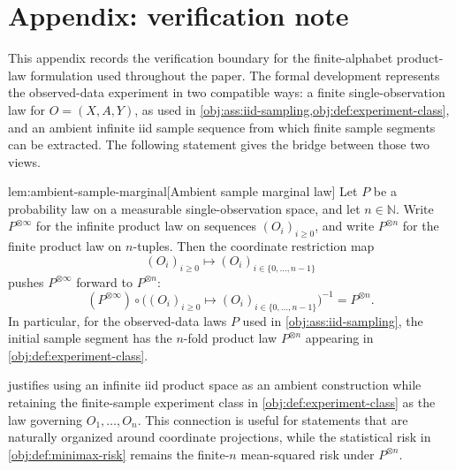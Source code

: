 \section{Appendix: verification note}

This appendix records the verification boundary for the finite-alphabet product-law formulation used throughout the paper. The formal development represents the observed-data experiment in two compatible ways: a finite single-observation law for \(O=(X,A,Y)\), as used in \cref{obj:ass:iid-sampling,obj:def:experiment-class}, and an ambient infinite iid sample sequence from which finite sample segments can be extracted. The following statement gives the bridge between those two views.

\begin{lemmav}{lem:ambient-sample-marginal}[Ambient sample marginal law]
Let \(P\) be a probability law on a measurable single-observation space, and let \(n\in\mathbb N\). Write \(P^{\otimes\infty}\) for the infinite product law on sequences \((O_i)_{i\ge 0}\), and write \(P^{\otimes n}\) for the finite product law on \(n\)-tuples. Then the coordinate restriction map
\[
(O_i)_{i\ge 0}\longmapsto (O_i)_{i\in\{0,\ldots,n-1\}}
\]
pushes \(P^{\otimes\infty}\) forward to \(P^{\otimes n}\):
\[
(P^{\otimes\infty})\circ\bigl((O_i)_{i\ge 0}\mapsto (O_i)_{i\in\{0,\ldots,n-1\}}\bigr)^{-1}
=
P^{\otimes n}.
\]
In particular, for the observed-data laws \(P\) used in \cref{obj:ass:iid-sampling}, the initial sample segment has the \(n\)-fold product law \(P^{\otimes n}\) appearing in \cref{obj:def:experiment-class}.
\end{lemmav}

 justifies using an infinite iid product space as an ambient construction while retaining the finite-sample experiment class in \cref{obj:def:experiment-class} as the law governing \(O_1,\ldots,O_n\). This connection is useful for statements that are naturally organized around coordinate projections, while the statistical risk in \cref{obj:def:minimax-risk} remains the finite-\(n\) mean-squared risk under \(P^{\otimes n}\).


